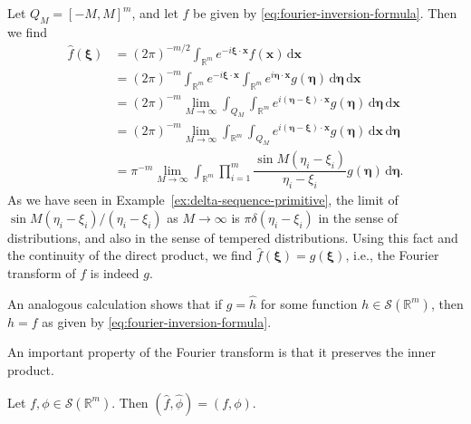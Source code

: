 \begin{Proof}
Let $Q_M=[-M,M]^m$, and let $f$ be given by \eqref{eq:fourier-inversion-formula}. Then we find
\begin{equation}\label{eq:fourier-inversion-cutoff-calculation}
\begin{aligned}
\widehat f(\bm{\xi})&=(2\pi)^{-m/2}\int_{\mathbb{R}^m}e^{-i\bm{\xi}\cdot\bm{x}}f(\bm{x})\,\mathrm{d}\bm{x}\\
&=(2\pi)^{-m}\int_{\mathbb{R}^m}e^{-i\bm{\xi}\cdot\bm{x}}\int_{\mathbb{R}^m}e^{i\bm{\eta}\cdot\bm{x}}g(\bm{\eta})\,\mathrm{d}\bm{\eta}\,\mathrm{d}\bm{x}\\
&=(2\pi)^{-m}\lim_{M\to\infty}\int_{Q_M}\int_{\mathbb{R}^m}e^{i(\bm{\eta}-\bm{\xi})\cdot\bm{x}}g(\bm{\eta})\,\mathrm{d}\bm{\eta}\,\mathrm{d}\bm{x}\\
&=(2\pi)^{-m}\lim_{M\to\infty}\int_{\mathbb{R}^m}\int_{Q_M}e^{i(\bm{\eta}-\bm{\xi})\cdot\bm{x}}g(\bm{\eta})\,\mathrm{d}\bm{x}\,\mathrm{d}\bm{\eta}\\
&=\pi^{-m}\lim_{M\to\infty}\int_{\mathbb{R}^m}\prod_{i=1}^m\dfrac{\sin M(\eta_i-\xi_i)}{\eta_i-\xi_i}g(\bm{\eta})\,\mathrm{d}\bm{\eta}.
\end{aligned}
\end{equation}
As we have seen in Example~\ref{ex:delta-sequence-primitive}, the limit of $\sin M(\eta_i-\xi_i)/(\eta_i-\xi_i)$ as $M\to\infty$ is $\pi\delta(\eta_i-\xi_i)$ in the sense of distributions, and also in the sense of tempered distributions. Using this fact and the continuity of the direct product, we find $\widehat f(\bm{\xi})=g(\bm{\xi})$, i.e., the Fourier transform of $f$ is indeed $g$.

An analogous calculation shows that if $g=\widehat h$ for some function $h\in\mathcal{S}(\mathbb{R}^m)$, then $h=f$ as given by \eqref{eq:fourier-inversion-formula}.
\end{Proof}

An important property of the Fourier transform is that it preserves the inner product.

\begin{Theorem}
\label{thm:fourier-inner-product-preservation}
Let $f,\phi\in\mathcal{S}(\mathbb{R}^m)$. Then $(\widehat f,\widehat\phi)=(f,\phi)$.
\end{Theorem}


